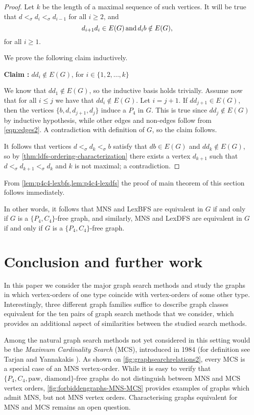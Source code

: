 \documentclass{svproc}
\begin{document}
\begin{proof}
Let $k$ be the length of a maximal sequence of such vertices. It will be true that $d<_\sigma d_i<_\sigma d_{i-1}$ for all $i\ge 2$, and 
\begin{equation}
\label{eqn:edges2}
d_{i+1}d_i\in E(G)\, {\rm and }\, d_ib\notin E(G),
\end{equation} for all $i\ge 1$. 


We prove the following claim inductively. 

\noindent\textbf{Claim :} $dd_i\notin E(G)$, for $i\in \{1,2, \dots, k\}$

We know that $dd_1\notin E(G)$, so the inductive basis holds trivially. Assume now that for all $i\le j$ we have that $dd_{i}\notin E(G)$. Let $i=j+1$. If $dd_{j+1}\in E(G)$, then the vertices $\{b,d,d_{j+1},d_j\}$ induce a $P_4$ in $G$. This is true since $dd_{j}\notin E(G)$ by inductive hypothesis, while other edges and non-edges follow from \ref{eqn:edges2}. A contradiction with definition of $G$, so the claim follows.
 
It follows that vertices $d<_\sigma d_k<_\sigma b$ satisfy that $db\in E(G)$ and $dd_k\notin E(G)$, so by \cref{thm:ldfs-ordering-characterization} there exists a vertex $d_{k+1}$ such that $d<_\sigma d_{k+1}<_\sigma d_k$ and $k$ is not maximal; a contradiction. 
\end{proof}
From \cref{lem:p4c4-lexbfs,lem:p4c4-lexdfs} the proof of main theorem of this section follows  immediately. 
\thmMNSldfsLBFS*

In other words, it follows that MNS and LexBFS are equivalent in $G$ if and only if $G$ is a $\{P_4,C_4\}$-free graph, and similarly, MNS and LexDFS are equivalent in $G$ if and only if $G$ is a $\{P_4,C_4\}$-free graph.


\fi
\section{Conclusion and further work}\label{sec:conclusion}

In this paper we consider the major graph search methods and study the graphs in which vertex-orders of one type coincide with vertex-orders of some other type. 
Interestingly, three different graph families suffice to describe graph classes equivalent for the ten pairs of graph search methods that we consider, which provides an additional aspect of similarities between the studied search methods.

Among the natural graph search methods not yet considered in this setting would be the
\emph{Maximum Cardinality Search} (MCS), introduced in 1984 (for definition see Tarjan and Yannakakis \cite{tarjan1984simple}). As shown on \cref{fig:graphsearchrelations2}, every MCS is a special case of an MNS vertex-order.
While it is easy to verify that  $\{P_4,C_4,\text{paw, diamond}\}$-free graphs do not distinguish between MNS and MCS vertex orders,  \cref{fig:forbiddengraphs-MNS-MCS} provides examples of graphs which admit MNS, but not MNS vertex orders. 
Characterising graphs equivalent for MNS and MCS remains an open question.
\end{document}
